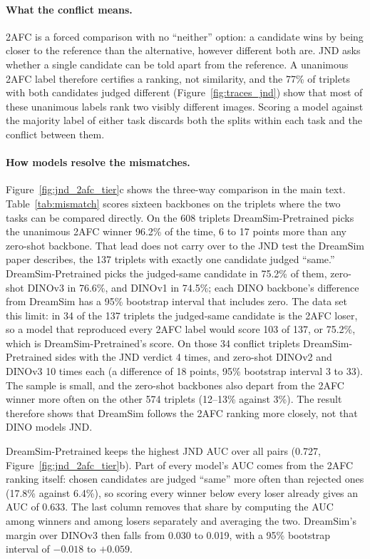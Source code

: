 \paragraph{What the conflict means.} 2AFC is a forced comparison with no ``neither'' option: a candidate wins by being closer to the reference than the alternative, however different both are. JND asks whether a single candidate can be told apart from the reference. A unanimous 2AFC label therefore certifies a ranking, not similarity, and the 77\% of triplets with both candidates judged different (Figure~\ref{fig:traces_jnd}) show that most of these unanimous labels rank two visibly different images. Scoring a model against the majority label of either task discards both the splits within each task and the conflict between them.

\paragraph{How models resolve the mismatches.} Figure~\ref{fig:jnd_2afc_tier}c shows the three-way comparison in the main text. Table~\ref{tab:mismatch} scores sixteen backbones on the triplets where the two tasks can be compared directly. On the 608 triplets DreamSim-Pretrained picks the unanimous 2AFC winner 96.2\% of the time, 6 to 17 points more than any zero-shot backbone. That lead does not carry over to the JND test the DreamSim paper describes, the 137 triplets with exactly one candidate judged ``same.'' DreamSim-Pretrained picks the judged-same candidate in 75.2\% of them, zero-shot DINOv3 in 76.6\%, and DINOv1 in 74.5\%; each DINO backbone's difference from DreamSim has a 95\% bootstrap interval that includes zero. The data set this limit: in 34 of the 137 triplets the judged-same candidate is the 2AFC loser, so a model that reproduced every 2AFC label would score 103 of 137, or 75.2\%, which is DreamSim-Pretrained's score. On those 34 conflict triplets DreamSim-Pretrained sides with the JND verdict 4 times, and zero-shot DINOv2 and DINOv3 10 times each (a difference of 18 points, 95\% bootstrap interval 3 to 33). The sample is small, and the zero-shot backbones also depart from the 2AFC winner more often on the other 574 triplets (12--13\% against 3\%). The result therefore shows that DreamSim follows the 2AFC ranking more closely, not that DINO models JND.

DreamSim-Pretrained keeps the highest JND AUC over all pairs (0.727, Figure~\ref{fig:jnd_2afc_tier}b). Part of every model's AUC comes from the 2AFC ranking itself: chosen candidates are judged ``same'' more often than rejected ones (17.8\% against 6.4\%), so scoring every winner below every loser already gives an AUC of 0.633. The last column removes that share by computing the AUC among winners and among losers separately and averaging the two. DreamSim's margin over DINOv3 then falls from 0.030 to 0.019, with a 95\% bootstrap interval of $-0.018$ to $+0.059$.

